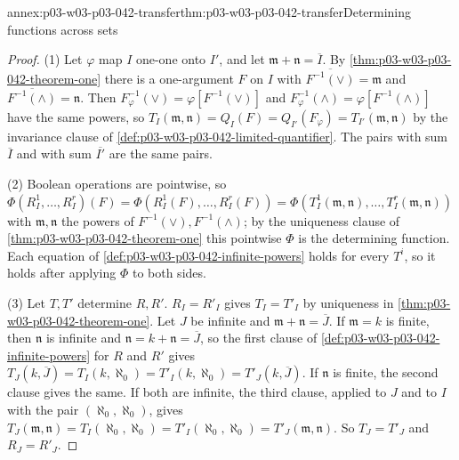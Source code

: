 \begin{annexitem}{annex:p03-w03-p03-042-transfer}{thm:p03-w03-p03-042-transfer}{Determining functions across sets}
\begin{proof}
(1) Let \(\varphi\) map \(I\) one-one onto \(I'\), and let
\(\mathfrak m+\mathfrak n=\overline I\).  By
\cref{thm:p03-w03-p03-042-theorem-one} there is a one-argument \(F\) on
\(I\) with \(\overline{F^{-1}(\vee)}=\mathfrak m\) and
\(\overline{F^{-1}(\wedge)}=\mathfrak n\).  Then \(F_\varphi^{-1}(\vee)=
\varphi[F^{-1}(\vee)]\) and \(F_\varphi^{-1}(\wedge)=\varphi[F^{-1}(\wedge)]\)
have the same powers, so \(T_I(\mathfrak m,\mathfrak n)=Q_I(F)=
Q_{I'}(F_\varphi)=T_{I'}(\mathfrak m,\mathfrak n)\) by the invariance
clause of \cref{def:p03-w03-p03-042-limited-quantifier}.  The pairs with
sum \(\overline I\) and with sum \(\overline{I'}\) are the same pairs.

(2) Boolean operations are pointwise, so \(\Phi(R^1_I,\ldots,R^r_I)(F)=
\Phi(R^1_I(F),\ldots,R^r_I(F))=\Phi(T^1_I(\mathfrak m,\mathfrak n),\ldots,
T^r_I(\mathfrak m,\mathfrak n))\) with \(\mathfrak m,\mathfrak n\) the
powers of \(F^{-1}(\vee),F^{-1}(\wedge)\); by the uniqueness clause of
\cref{thm:p03-w03-p03-042-theorem-one} this pointwise \(\Phi\) is the
determining function.  Each equation of
\cref{def:p03-w03-p03-042-infinite-powers} holds for every \(T^i\), so it
holds after applying \(\Phi\) to both sides.

(3) Let \(T,T'\) determine \(R,R'\).  \(R_I=R'_I\) gives \(T_I=T'_I\) by
uniqueness in \cref{thm:p03-w03-p03-042-theorem-one}.  Let \(J\) be
infinite and \(\mathfrak m+\mathfrak n=\overline J\).  If \(\mathfrak m=k\)
is finite, then \(\mathfrak n\) is infinite and \(\mathfrak n=k+\mathfrak
n=\overline J\), so the first clause of
\cref{def:p03-w03-p03-042-infinite-powers} for \(R\) and \(R'\) gives
\(T_J(k,\overline J)=T_I(k,\aleph_0)=T'_I(k,\aleph_0)=T'_J(k,\overline J)\).
If \(\mathfrak n\) is finite, the second clause gives the same.  If both
are infinite, the third clause, applied to \(J\) and to \(I\) with the pair
\((\aleph_0,\aleph_0)\), gives \(T_J(\mathfrak m,\mathfrak n)=
T_I(\aleph_0,\aleph_0)=T'_I(\aleph_0,\aleph_0)=T'_J(\mathfrak m,\mathfrak
n)\).  So \(T_J=T'_J\) and \(R_J=R'_J\).
\end{proof}
\end{annexitem}

